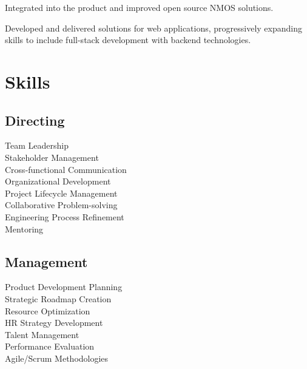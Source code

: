 \documentclass[]{private}
\begin{document}
\begin{paracol}{2}
    \begin{tightemize}
        \item Integrated into the product and improved open source NMOS solutions.
    \end{tightemize}
    \sectionsep

    \begin{tightemize}
        \item Developed and delivered solutions for web applications, progressively expanding skills to include full-stack development with backend technologies.
    \end{tightemize}
    \sectionsep
\switchcolumn[1]

    
    \section{Skills}
    \subsection{Directing}
    \vspace{\topsep}
    \setlength{\hangingindent}{3mm}
    \textbullet{} Team Leadership \\
    \textbullet{} Stakeholder Management \\
    \textbullet{} Cross-functional Communication \\
    \textbullet{} Organizational Development \\
    \textbullet{} Project Lifecycle Management \\
    \textbullet{} Collaborative Problem-solving \\
    \textbullet{} Engineering Process Refinement \\
    \textbullet{} Mentoring
    \sectionsep
    
    \subsection{Management}
    \vspace{\topsep}
    \textbullet{} Product Development Planning \\
    \textbullet{} Strategic Roadmap Creation \\
    \textbullet{} Resource Optimization \\
    \textbullet{} HR Strategy Development \\
    \textbullet{} Talent Management \\
    \textbullet{} Performance Evaluation \\
    \textbullet{} Agile/Scrum Methodologies
    \sectionsep
    

\end{paracol}
\end{document}
